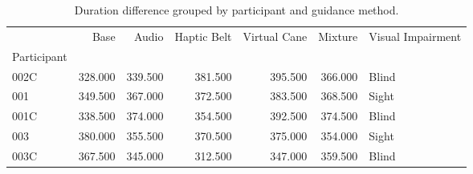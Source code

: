 
\begin{table}[!htb]
\centering
\caption{Duration difference grouped by participant and guidance method.}
\label{tab:duracao_average}
\begin{tabular}{lrrrrrl}
\toprule
{} &    Base &   Audio &  Haptic Belt &  Virtual Cane &  Mixture & Visual Impairment \\
Participant &         &         &              &               &          &                   \\
\midrule
002C        & 328.000 & 339.500 &      381.500 &       395.500 &  366.000 &             Blind \\
001         & 349.500 & 367.000 &      372.500 &       383.500 &  368.500 &             Sight \\
001C        & 338.500 & 374.000 &      354.500 &       392.500 &  374.500 &             Blind \\
003         & 380.000 & 355.500 &      370.500 &       375.000 &  354.000 &             Sight \\
003C        & 367.500 & 345.000 &      312.500 &       347.000 &  359.500 &             Blind \\
\bottomrule
\end{tabular}
\end{table}

